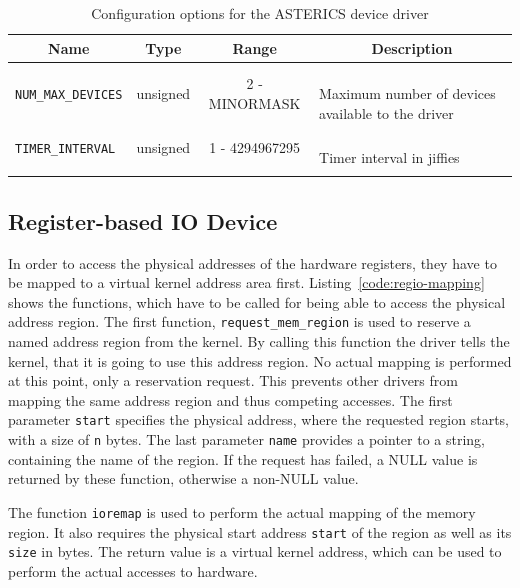 \begin{longtable}[ht]{|l|c|c|l|}
    \hline
    \multicolumn{1}{|c|}{\textbf{Name}} & \multicolumn{1}{c|}{\textbf{Type}} & \multicolumn{1}{c|}{\textbf{Range}} & \multicolumn{1}{c|}{\textbf{Description}} \\
    \hline
    \texttt{NUM\_MAX\_DEVICES} & unsigned & 2 - MINORMASK & \parbox{5.5cm}{\ \\
        Maximum number of devices available to the driver \\
    }\\
    \hline
    \texttt{TIMER\_INTERVAL} & unsigned & 1 - 4294967295 & \parbox{5.5cm}{\ \\
        Timer interval in jiffies \\
    }\\
    \hline
    \caption{Configuration options for the ASTERICS device driver}
    \label{table:device_driver:config}
\end{longtable}


\subsection{Register-based IO Device}

In order to access the physical addresses of the hardware registers, they have to be mapped to a virtual kernel address area first.
Listing~\ref{code:regio-mapping} shows the functions, which have to be called for being able to access the physical address region.
The first function, \texttt{request\_mem\_region} is used to reserve a named address region from the kernel. 
By calling this function the driver tells the kernel, that it is going to use this address region.
No actual mapping is performed at this point, only a reservation request.
This prevents other drivers from mapping the same address region and thus competing accesses.
The first parameter \texttt{start} specifies the physical address, where the requested region starts, with a size of \texttt{n} bytes.
The last parameter \texttt{name} provides a pointer to a string, containing the name of the region.
If the request has failed, a NULL value is returned by these function, otherwise a non-NULL value.

The function \texttt{ioremap} is used to perform the actual mapping of the memory region.
It also requires the physical start address \texttt{start} of the region as well as its \texttt{size} in bytes.
The return value is a virtual kernel address, which can be used to perform the actual accesses to hardware.

